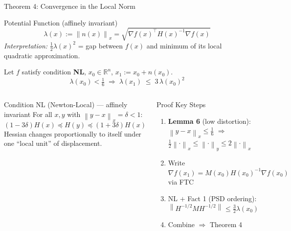 \documentclass[aspectratio=169,10pt]{beamer}
\newcommand{\R}{\mathbb{R}}
\newcommand{\grad}{\nabla}
\newcommand{\lnorm}[2]{\left\|#1\right\|_{#2}}
\begin{document}
\begin{frame}{Theorem 4: Convergence in the Local Norm}
  \begin{block}{Potential Function (affinely invariant)}
    \[
      \lambda(x) := \lnorm{n(x)}{x}
               = \sqrt{\grad f(x)^\top H(x)^{-1}\grad f(x)}
    \]
    \emph{Interpretation:} $\tfrac{1}{2}\lambda(x)^2$
    = gap between $f(x)$ and minimum of its local quadratic approximation.
  \end{block}

  \begin{theorem}
    Let $f$ satisfy condition \textbf{NL}, $x_0\in\R^n$, $x_1:=x_0+n(x_0)$.
    \[
      \lambda(x_0) < \tfrac{1}{6}
      \;\Longrightarrow\;
      \lambda(x_1) \;\le\; 3\,\lambda(x_0)^2
    \]
  \end{theorem}

  \begin{columns}[T]
      \begin{block}{Condition NL (Newton-Local) --- affinely invariant}
        For all $x,y$ with $\lnorm{y-x}{x}=\delta<1$:
        \[
          (1-3\delta)H(x) \preceq H(y) \preceq (1+3\delta)H(x)
        \]
        Hessian changes proportionally to itself
        under one ``local unit'' of displacement.
      \end{block}

      \begin{exampleblock}{Proof Key Steps}
        \begin{enumerate}
          \item \textbf{Lemma 6} (low distortion):
                $\lnorm{y-x}{x}\le\tfrac{1}{6}$
                $\Rightarrow$ $\tfrac{1}{2}\lnorm{\cdot}{x}\le\lnorm{\cdot}{y}\le 2\lnorm{\cdot}{x}$
          \item Write $\grad f(x_1)=M(x_0)H(x_0)^{-1}\grad f(x_0)$ via FTC
          \item NL $+$ Fact 1 (PSD ordering):
                $\lnorm{H^{-1/2}MH^{-1/2}}{}\le\tfrac{3}{2}\lambda(x_0)$
          \item Combine $\Rightarrow$ Theorem 4
        \end{enumerate}
      \end{exampleblock}
  \end{columns}
\end{frame}
\end{document}
